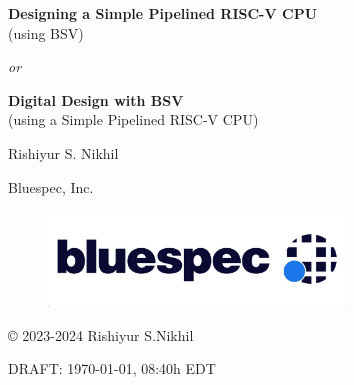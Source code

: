 
\pagestyle{empty}

\begin{center}

\vspace*{1.5in}

{\LARGE\bf Designing a Simple Pipelined RISC-V CPU} \\
{\Large (using BSV)}

\emph{or}

{\LARGE\bf Digital Design with BSV} \\
{\Large (using a Simple Pipelined RISC-V CPU)}

\vspace{2cm}

{\Large Rishiyur S. Nikhil}

Bluespec, Inc.

\vspace*{0.5in}

\begin{figure}[htbp]
  \centerline{\includegraphics[height=1in,angle=0]{ch000_front/Bluespec_Logo_2022-10}}
\end{figure}

\vspace*{0.5in}

\copyright{} 2023-2024 Rishiyur S.Nikhil

\vspace{1in}

{\small DRAFT: \today, 08:40h EDT}

\end{center}


% 



\vspace*{2in}


% 


\newpage

\pagestyle{myheadings}


{\small

\tableofcontents

}





